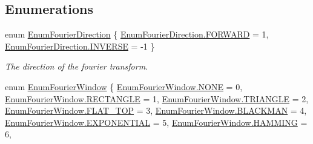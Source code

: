 \subsection*{Enumerations}
\begin{DoxyCompactItemize}
\item 
enum \mbox{\hyperlink{namespace_c_s_i_1_1_library_1_1_math_utilities_a25c85ccfcf761427d9af99edaac04c13}{Enum\+Fourier\+Direction}} \{ \mbox{\hyperlink{namespace_c_s_i_1_1_library_1_1_math_utilities_a25c85ccfcf761427d9af99edaac04c13abfec72bb37910c61f36b6c29a1f7ec31}{Enum\+Fourier\+Direction.\+F\+O\+R\+W\+A\+RD}} = 1, 
\mbox{\hyperlink{namespace_c_s_i_1_1_library_1_1_math_utilities_a25c85ccfcf761427d9af99edaac04c13a1955bdc302911f376074eb9b02e56639}{Enum\+Fourier\+Direction.\+I\+N\+V\+E\+R\+SE}} = -\/1
 \}
\begin{DoxyCompactList}\small\item\em The direction of the fourier transform. \end{DoxyCompactList}\item 
enum \mbox{\hyperlink{namespace_c_s_i_1_1_library_1_1_math_utilities_ae198dd0fb970192351d3966c18b65f06}{Enum\+Fourier\+Window}} \{ \newline
\mbox{\hyperlink{namespace_c_s_i_1_1_library_1_1_math_utilities_ae198dd0fb970192351d3966c18b65f06ab50339a10e1de285ac99d4c3990b8693}{Enum\+Fourier\+Window.\+N\+O\+NE}} = 0, 
\mbox{\hyperlink{namespace_c_s_i_1_1_library_1_1_math_utilities_ae198dd0fb970192351d3966c18b65f06a8e8e58fe94ab307a826e087028a7c01a}{Enum\+Fourier\+Window.\+R\+E\+C\+T\+A\+N\+G\+LE}} = 1, 
\mbox{\hyperlink{namespace_c_s_i_1_1_library_1_1_math_utilities_ae198dd0fb970192351d3966c18b65f06a9bcd89070cae224dce305f5011659ef4}{Enum\+Fourier\+Window.\+T\+R\+I\+A\+N\+G\+LE}} = 2, 
\mbox{\hyperlink{namespace_c_s_i_1_1_library_1_1_math_utilities_ae198dd0fb970192351d3966c18b65f06a6835c733fedbc14938310413c203aad5}{Enum\+Fourier\+Window.\+F\+L\+A\+T\+\_\+\+T\+OP}} = 3, 
\newline
\mbox{\hyperlink{namespace_c_s_i_1_1_library_1_1_math_utilities_ae198dd0fb970192351d3966c18b65f06ab88e580bff635f922a9f3d0e37fac433}{Enum\+Fourier\+Window.\+B\+L\+A\+C\+K\+M\+AN}} = 4, 
\mbox{\hyperlink{namespace_c_s_i_1_1_library_1_1_math_utilities_ae198dd0fb970192351d3966c18b65f06adcd5fc33e211f31cef0cd7cb36518d31}{Enum\+Fourier\+Window.\+E\+X\+P\+O\+N\+E\+N\+T\+I\+AL}} = 5, 
\mbox{\hyperlink{namespace_c_s_i_1_1_library_1_1_math_utilities_ae198dd0fb970192351d3966c18b65f06a65f8928046bffc8d0f6a445a6ce4f63f}{Enum\+Fourier\+Window.\+H\+A\+M\+M\+I\+NG}} = 6, 

\end{DoxyCompactItemize}

